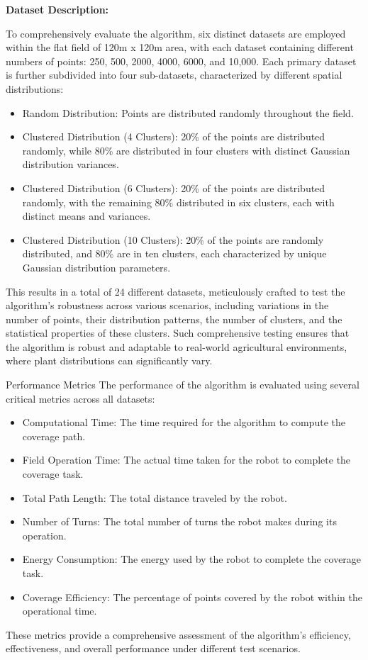 \vspace{3mm}  

\textbf{Dataset Description:}
\vspace{3mm}  


To comprehensively evaluate the algorithm, six distinct datasets are employed within the flat field of 120m x 120m area, with each dataset containing different numbers of points: 250, 500, 2000, 4000, 6000, and 10,000. Each primary dataset is further subdivided into four sub-datasets, characterized by different spatial distributions:

\begin{itemize}
    \item Random Distribution: Points are distributed randomly throughout the field.
    \item Clustered Distribution (4 Clusters): 20\% of the points are distributed randomly, while 80\% are distributed in four clusters with distinct Gaussian distribution variances.
    \item Clustered Distribution (6 Clusters): 20\% of the points are distributed randomly, with the remaining 80\% distributed in six clusters, each with distinct means and variances.
    \item Clustered Distribution (10 Clusters): 20\% of the points are randomly distributed, and 80\% are in ten clusters, each characterized by unique Gaussian distribution parameters.
\end{itemize}

This results in a total of 24 different datasets, meticulously crafted to test the algorithm's robustness across various scenarios, including variations in the number of points, their distribution patterns, the number of clusters, and the statistical properties of these clusters. Such comprehensive testing ensures that the algorithm is robust and adaptable to real-world agricultural environments, where plant distributions can significantly vary.

\vspace{3mm}  

Performance Metrics
The performance of the algorithm is evaluated using several critical metrics across all datasets:

\begin{itemize}
    \item Computational Time: The time required for the algorithm to compute the coverage path.
    \item Field Operation Time: The actual time taken for the robot to complete the coverage task.
    \item Total Path Length: The total distance traveled by the robot.
    \item Number of Turns: The total number of turns the robot makes during its operation.
    \item Energy Consumption: The energy used by the robot to complete the coverage task.
    \item Coverage Efficiency: The percentage of points covered by the robot within the operational time.
\end{itemize}
These metrics provide a comprehensive assessment of the algorithm's efficiency, effectiveness, and overall performance under different test scenarios.

